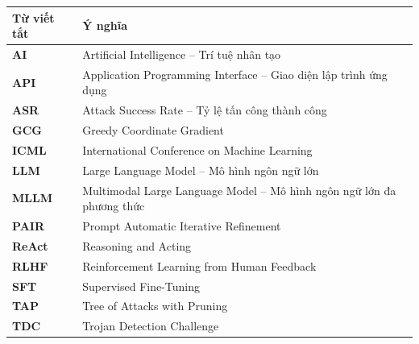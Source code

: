 \documentclass[12pt,a4paper]{article}
\begin{document}
\begin{center}
\begin{tabularx}{\textwidth}{
    >{\bfseries}p{}
    X
}
\toprule
\textbf{Từ viết tắt} & \textbf{Ý nghĩa} \\
\midrule

AI
& Artificial Intelligence -- Trí tuệ nhân tạo \\

API
& Application Programming Interface -- Giao diện lập trình ứng dụng \\

ASR
& Attack Success Rate -- Tỷ lệ tấn công thành công \\

GCG
& Greedy Coordinate Gradient \\

ICML
& International Conference on Machine Learning \\

LLM
& Large Language Model -- Mô hình ngôn ngữ lớn \\

MLLM
& Multimodal Large Language Model -- Mô hình ngôn ngữ lớn đa phương thức \\

PAIR
& Prompt Automatic Iterative Refinement \\

ReAct
& Reasoning and Acting \\

RLHF
& Reinforcement Learning from Human Feedback \\

SFT
& Supervised Fine-Tuning \\

TAP
& Tree of Attacks with Pruning \\

TDC
& Trojan Detection Challenge \\

\bottomrule
\end{tabularx}
\end{center}

\newpage

{}
\listoffigures
\newpage

{}
\listoftables
\newpage

\setcounter{page}{1}
\setcounter{figure}{0}
\setcounter{table}{0}
\end{document}
